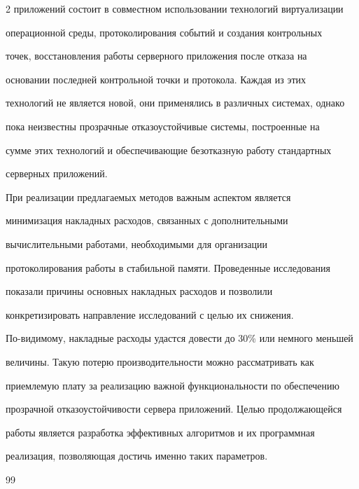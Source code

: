 \begin{multicols}{2}
приложений состоит в совместном использовании технологий виртуализации

операционной среды, протоколирования событий и создания контрольных

точек, восстановления работы серверного приложения после отказа на

основании последней контрольной точки и протокола. Каждая из этих

технологий не является новой, они применялись в различных системах, однако

пока неизвестны прозрачные отказоустойчивые сис\-те\-мы, построенные на

сумме этих технологий и обеспечивающие безотказную работу стандартных

серверных приложений.



При реализации предлагаемых методов важным аспектом является

минимизация накладных расходов,  связанных с дополнительными

вы\-чис\-литель\-ны\-ми работами, необходимыми для ор\-га\-низа\-ции

протоколирования  работы в стабильной памяти. Проведенные исследования

показали причины основных накладных расходов и позволили

конкретизировать направление исследований с \mbox{целью} их снижения.

По-видимому, накладные расходы удастся довести до 30\% или немного меньшей

величины. Такую потерю производительности можно рассматривать как

приемлемую плату за реализацию важной функцио\-нальности по обеспечению

прозрачной отказоустойчивости сервера приложений. Целью продолжающейся

работы является разработка эффективных алгоритмов и их программная

\mbox{реализация}, позволяющая достичь именно таких параметров.



{\small\frenchspacing

{%


\begin{thebibliography}{99}


{\sf

}
\end{thebibliography}}}
\end{multicols}

